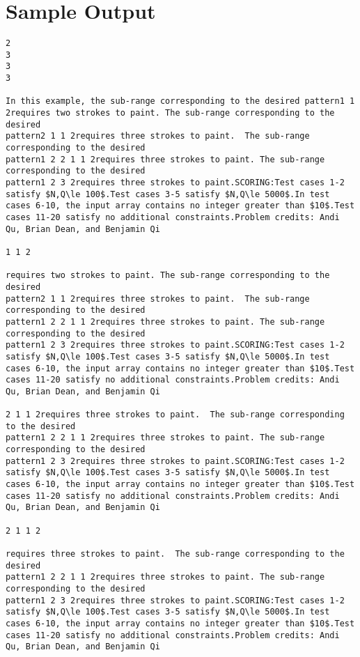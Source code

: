 \documentclass[12pt]{article}
\begin{document}
\section*{Sample Output}
\begin{verbatim}
2
3
3
3

In this example, the sub-range corresponding to the desired pattern1 1 2requires two strokes to paint. The sub-range corresponding to the desired
pattern2 1 1 2requires three strokes to paint.  The sub-range corresponding to the desired
pattern1 2 2 1 1 2requires three strokes to paint. The sub-range corresponding to the desired
pattern1 2 3 2requires three strokes to paint.SCORING:Test cases 1-2 satisfy $N,Q\le 100$.Test cases 3-5 satisfy $N,Q\le 5000$.In test cases 6-10, the input array contains no integer greater than $10$.Test cases 11-20 satisfy no additional constraints.Problem credits: Andi Qu, Brian Dean, and Benjamin Qi

1 1 2

requires two strokes to paint. The sub-range corresponding to the desired
pattern2 1 1 2requires three strokes to paint.  The sub-range corresponding to the desired
pattern1 2 2 1 1 2requires three strokes to paint. The sub-range corresponding to the desired
pattern1 2 3 2requires three strokes to paint.SCORING:Test cases 1-2 satisfy $N,Q\le 100$.Test cases 3-5 satisfy $N,Q\le 5000$.In test cases 6-10, the input array contains no integer greater than $10$.Test cases 11-20 satisfy no additional constraints.Problem credits: Andi Qu, Brian Dean, and Benjamin Qi

2 1 1 2requires three strokes to paint.  The sub-range corresponding to the desired
pattern1 2 2 1 1 2requires three strokes to paint. The sub-range corresponding to the desired
pattern1 2 3 2requires three strokes to paint.SCORING:Test cases 1-2 satisfy $N,Q\le 100$.Test cases 3-5 satisfy $N,Q\le 5000$.In test cases 6-10, the input array contains no integer greater than $10$.Test cases 11-20 satisfy no additional constraints.Problem credits: Andi Qu, Brian Dean, and Benjamin Qi

2 1 1 2

requires three strokes to paint.  The sub-range corresponding to the desired
pattern1 2 2 1 1 2requires three strokes to paint. The sub-range corresponding to the desired
pattern1 2 3 2requires three strokes to paint.SCORING:Test cases 1-2 satisfy $N,Q\le 100$.Test cases 3-5 satisfy $N,Q\le 5000$.In test cases 6-10, the input array contains no integer greater than $10$.Test cases 11-20 satisfy no additional constraints.Problem credits: Andi Qu, Brian Dean, and Benjamin Qi


\end{verbatim}
\end{document}
